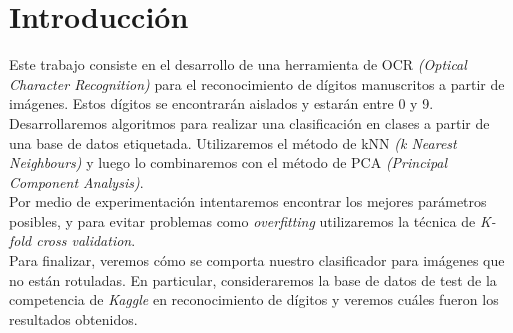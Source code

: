 \section{Introducción}

Este trabajo consiste en el desarrollo de una herramienta de OCR \textit{(Optical Character Recognition)} para el reconocimiento de dígitos manuscritos a partir de imágenes. Estos dígitos se encontrarán aislados y estarán entre 0 y 9. \\

Desarrollaremos algoritmos para realizar una clasificación en clases a partir de una base de datos etiquetada. Utilizaremos el método de kNN \textit{(k Nearest Neighbours)} y luego lo combinaremos con el método de PCA \textit{(Principal Component Analysis)}. \\

Por medio de experimentación intentaremos encontrar los mejores parámetros posibles, y para evitar problemas como \textit{overfitting} utilizaremos la técnica de \textit{K-fold cross validation}. \\

Para finalizar, veremos cómo se comporta nuestro clasificador para imágenes que no están rotuladas. En particular, consideraremos la base de datos de test de la competencia de \textit{Kaggle} en reconocimiento de dígitos y veremos cuáles fueron los resultados obtenidos. \\
